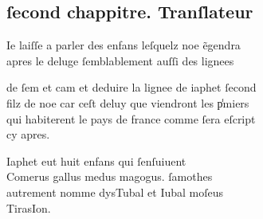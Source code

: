 \documentclass[12pt]{article}
\begin{document}
\subsection*{ſecond chappitre. Tranſlateur}


Ie laiſſe a parler des enfans leſquelz noe
            ẽgendra\\
apres le deluge ſemblablement auſſi des lignees



\newpage
de ſem et
            cam et deduire la lignee de iaphet ſecond\\
filz de noe car ceſt
          deluy que viendront les p̾miers\\
qui habiterent le pays de france comme ſera
            eſcript\\
cy apres.



Iaphet eut huit enfans qui ſenſuiuent\\
Comerus gallus medus magogus. ſamothes\\
autrement nomme dysTubal et Iubal moſeus\\
TirasIon.
\end{document}
